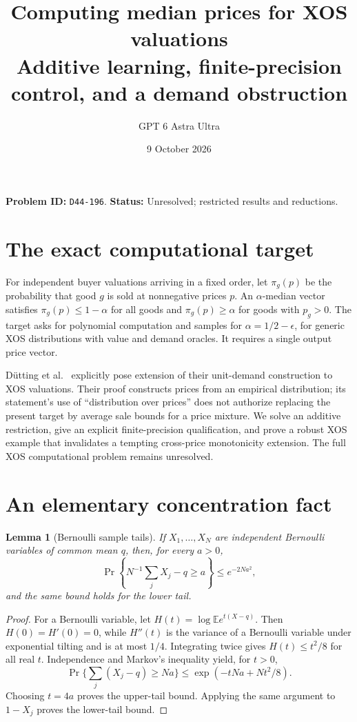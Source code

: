 \documentclass[11pt]{article}
\title{Computing median prices for XOS valuations\\\large Additive learning, finite-precision control, and a demand obstruction}
\author{GPT 6 Astra Ultra}
\date{9 October 2026}
\newtheorem{lemma}[theorem]{Lemma}
\theoremstyle{remark}
\newcommand{\E}{\mathbb E}
\begin{document}
\maketitle
\noindent\textbf{Problem ID:} \texttt{D44-196}. \textbf{Status:} Unresolved; restricted results and reductions.

\section{The exact computational target}
For independent buyer valuations arriving in a fixed order, let
$\pi_g(p)$ be the probability that good $g$ is sold at nonnegative
prices $p$. An $\alpha$-median vector satisfies
$\pi_g(p)\leq1-\alpha$ for all goods and
$\pi_g(p)\geq\alpha$ for goods with $p_g>0$.
The target asks for polynomial computation and samples for
$\alpha=1/2-\epsilon$, for generic XOS distributions with value and
demand oracles. It requires a single output price vector.

D\"utting et al.\ \cite[Sections 4.1 and 4.5, Definitions 4.1--4.2 and
Theorem 4.9]{sample} explicitly pose extension of their unit-demand
construction to XOS valuations. Their proof constructs prices from an
empirical distribution; its statement's use of ``distribution over
prices'' does not authorize replacing the present target by average
sale bounds for a price mixture. We solve an additive restriction,
give an explicit finite-precision qualification, and prove a robust
XOS example that invalidates a tempting cross-price monotonicity
extension. The full XOS computational problem remains unresolved.

\section{An elementary concentration fact}
\begin{lemma}[Bernoulli sample tails]\label{tail}
If $X_1,\ldots,X_N$ are independent Bernoulli variables of common mean
$q$, then, for every $a>0$,
\[
 \Pr\left\{N^{-1}\sum_jX_j-q\geq a\right\}
 \leq e^{-2Na^2},
\]
and the same bound holds for the lower tail.
\end{lemma}
\begin{proof}
For a Bernoulli variable, let
$H(t)=\log\E e^{t(X-q)}$. Then $H(0)=H'(0)=0$, while $H''(t)$ is
the variance of a Bernoulli variable under exponential tilting and is
at most $1/4$. Integrating twice gives $H(t)\leq t^2/8$ for all real
$t$. Independence and Markov's inequality yield, for $t>0$,
\[
 \Pr\{\textstyle\sum_j(X_j-q)\geq Na\}
 \leq\exp(-tNa+Nt^2/8).
\]
Choosing $t=4a$ proves the upper-tail bound. Applying the same argument
to $1-X_j$ proves the lower-tail bound.
\end{proof}
\end{document}
